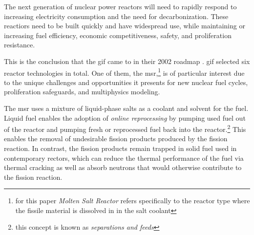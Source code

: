 \documentclass[letterpaper]{mc2023}
\begin{document}
 
The next generation of nuclear power reactors will need to rapidly respond to
increasing electricity consumption and the need for decarbonization. These
reactiors need to be built quickly and have widespread use, while maintaining or
increasing fuel efficiency, economic competitiveness, safety, and proliferation
resistance.

This is the conclusion that the \Gls{gif} came to in their 2002
roadmap \cite{doe-ne_technology_2002}. \Gls{gif} selected six reactor
technologies in total. One of them, the \Gls{msr},\footnote{for
this paper {\it Molten Salt Reactor} refers specifically to the reactor type
where the fissile material is dissolved in in the salt coolant} is of
particular interest due to the unique challenges and opportunities it presents
for new nuclear fuel cycles, proliferation safeguards, and multiphysics
modeling.

The \Gls{msr} uses a mixture of liquid-phase salts as a coolant and solvent for
the fuel. Liquid fuel enables the adoption of {\it online reprocessing} by
pumping used fuel out of the reactor and pumping fresh or reprocessed fuel back
into the reactor.\footnote{this concept is known as {\it separations and feeds}}
This enables the removal of undesirable fission products produced by the fission
reaction. In contrast, the fission
products remain trapped in solid fuel used in contemporary rectors, which can
reduce the thermal performance of the fuel via thermal cracking as well as
absorb neutrons that would otherwise contribute to the fission reaction. 

\end{document}
